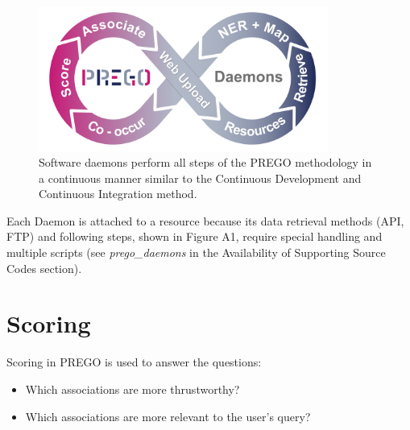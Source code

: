\begin{figure}[ht]
   \centering
   \includegraphics[width=95mm]{figures/figure_A1_PREGO_daemons.png}
   \caption[PREGO DevOps]{Software daemons perform all steps of the PREGO methodology in a continuous manner similar to the Continuous Development and Continuous Integration method.}
   \label{fig:devops}
\end{figure}


Each Daemon is attached to a resource because its data retrieval methods (API, FTP) and following steps, shown in Figure A1, require special handling and multiple scripts (see \textit{prego\_daemons} in the Availability of Supporting Source Codes section).

\section{Scoring}
\label{app:C}


Scoring in PREGO is used to answer the questions:
\begin{itemize}
   \item Which associations are more thrustworthy?
   \item Which associations are more relevant to the user's query?
\end{itemize}

